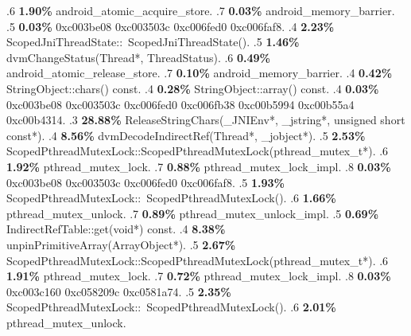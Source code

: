 \begin{profile}
{.6 \textbf{1.90\%} android\_atomic\_acquire\_store. 
.7 \textbf{0.03\%} android\_memory\_barrier. 
.5 \textbf{0.03\%} 0xc003be08\newline {} 0xc003503c\newline {} 0xc006fed0\newline {} 0xc006faf8. 
.4 \textbf{2.23\%} ScopedJniThreadState::~ScopedJniThreadState(). 
.5 \textbf{1.46\%} dvmChangeStatus(Thread*, ThreadStatus). 
.6 \textbf{0.49\%} android\_atomic\_release\_store. 
.7 \textbf{0.10\%} android\_memory\_barrier. 
.4 \textbf{0.42\%} StringObject::chars() const. 
.4 \textbf{0.28\%} StringObject::array() const. 
.4 \textbf{0.03\%} 0xc003be08\newline {} 0xc003503c\newline {} 0xc006fed0\newline {} 0xc006fb38\newline {} 0xc00b5994\newline {} 0xc00b55a4\newline {} 0xc00b4314. 
.3 \textbf{28.88\%} ReleaseStringChars(\_JNIEnv*, \_jstring*, unsigned short const*). 
.4 \textbf{8.56\%} dvmDecodeIndirectRef(Thread*, \_jobject*). 
.5 \textbf{2.53\%} ScopedPthreadMutexLock::ScopedPthreadMutexLock(pthread\_mutex\_t*). 
.6 \textbf{1.92\%} pthread\_mutex\_lock. 
.7 \textbf{0.88\%} pthread\_mutex\_lock\_impl. 
.8 \textbf{0.03\%} 0xc003be08\newline {} 0xc003503c\newline {} 0xc006fed0\newline {} 0xc006faf8. 
.5 \textbf{1.93\%} ScopedPthreadMutexLock::~ScopedPthreadMutexLock(). 
.6 \textbf{1.66\%} pthread\_mutex\_unlock. 
.7 \textbf{0.89\%} pthread\_mutex\_unlock\_impl. 
.5 \textbf{0.69\%} IndirectRefTable::get(void*) const. 
.4 \textbf{8.38\%} unpinPrimitiveArray(ArrayObject*). 
.5 \textbf{2.67\%} ScopedPthreadMutexLock::ScopedPthreadMutexLock(pthread\_mutex\_t*). 
.6 \textbf{1.91\%} pthread\_mutex\_lock. 
.7 \textbf{0.72\%} pthread\_mutex\_lock\_impl. 
.8 \textbf{0.03\%} 0xc003c160\newline {} 0xc058209c\newline {} 0xc0581a74. 
.5 \textbf{2.35\%} ScopedPthreadMutexLock::~ScopedPthreadMutexLock(). 
.6 \textbf{2.01\%} pthread\_mutex\_unlock. 
}
\end{profile}
